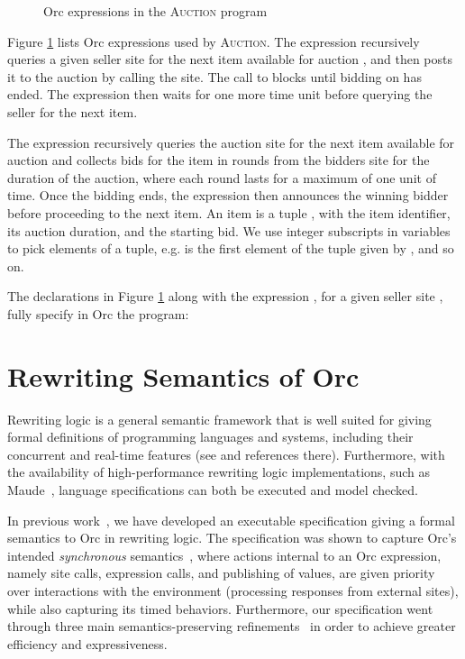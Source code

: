 \documentclass{eptcs}
\begin{document}
\begin{figure} 	
	\centering
\begin{small}

\end{small}
	\caption{Orc expressions in the \textsc{Auction} program}
    \label{fig:Auction-exprs}
\end{figure}


Figure \ref{fig:Auction-exprs} lists Orc expressions used by \textsc{Auction}. 
The  expression recursively queries a given seller site for the next item available for auction , and then posts it to the auction by calling the  site. The call to  blocks until bidding on  has ended. The  expression then waits for one more time unit before querying the seller for the next item.

The  expression recursively queries the auction site for the next item available for auction and collects bids for the item in rounds from the bidders site for the duration of the auction, where each round lasts for a maximum of one unit of time. Once the bidding ends, the  expression then announces the winning bidder before proceeding to the next item. An item is a tuple , with  the item identifier,  its auction duration, and  the starting bid. We use integer subscripts in variables to pick elements of a tuple, e.g.  is the first element of the tuple given by , and so on.

The declarations in Figure \ref{fig:Auction-exprs} along with the expression , for a given seller site , fully specify in Orc the  program:





\section{Rewriting Semantics of Orc} \label{sec:rewriting-semantics}



Rewriting logic \cite{RL92} is a general semantic framework that is well suited for giving formal  
definitions of programming languages and systems, including their concurrent and real-time features (see
\cite{meseguer-rosu-ijcar04,meseguer-rosu-tcs,journ-rtm} and references there).
Furthermore, with the availability of high-performance
rewriting logic implementations, such as Maude~\cite{maude-book},
language specifications can both be executed and model checked.

In previous work~\cite{AlTurkiM07WWV}, we have developed an executable specification giving a formal semantics to Orc in rewriting logic. The specification was shown to capture Orc's intended \emph{synchronous} semantics~\cite{AlTurkiM07tr}, where actions internal to an Orc expression, namely site calls, expression calls, and publishing of values, are given priority over interactions with the environment (processing responses from external sites), while also capturing its timed behaviors. Furthermore, our specification went through three main semantics-preserving refinements~\cite{AlTurkiM07PPDP,AlTurkiM07tr,AlTurkiM07WWV} in order to achieve greater efficiency and expressiveness. 
\end{document}
